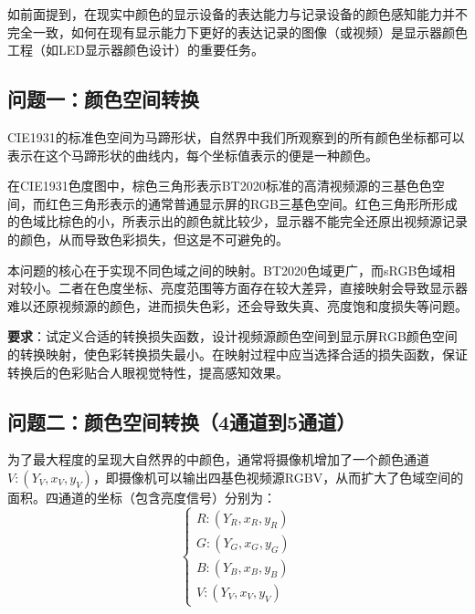 如前面提到，在现实中颜色的显示设备的表达能力与记录设备的颜色感知能力并不完全一致，如何在现有显示能力下更好的表达记录的图像（或视频）是显示器颜色工程（如LED显示器颜色设计）的重要任务。

\subsection[\hspace{-2pt}问题一：颜色空间转换]{{\heiti{} \hspace{-8pt}问题一：颜色空间转换}}\label{subsection1: 问题一}

CIE1931的标准色空间为马蹄形状，自然界中我们所观察到的所有颜色坐标都可以表示在这个马蹄形状的曲线内，每个坐标值表示的便是一种颜色。

在CIE1931色度图中，棕色三角形表示BT2020标准的高清视频源的三基色色空间，而红色三角形表示的通常普通显示屏的RGB三基色空间。红色三角形所形成的色域比棕色的小，所表示出的颜色就比较少，显示器不能完全还原出视频源记录的颜色，从而导致色彩损失，但这是不可避免的。

本问题的核心在于实现不同色域之间的映射。BT2020色域更广，而sRGB色域相对较小。二者在色度坐标、亮度范围等方面存在较大差异，直接映射会导致显示器难以还原视频源的颜色，进而损失色彩，还会导致失真、亮度饱和度损失等问题。

\textbf{要求}：试定义合适的转换损失函数，设计视频源颜色空间到显示屏RGB颜色空间的转换映射，使色彩转换损失最小。在映射过程中应当选择合适的损失函数，保证转换后的色彩贴合人眼视觉特性，提高感知效果。

\subsection[\hspace{-2pt}问题二：颜色空间转换（4通道到5通道）]{{\heiti{} \hspace{-8pt}问题二：颜色空间转换（4通道到5通道）}}\label{subsection1: 问题二}

为了最大程度的呈现大自然界的中颜色，通常将摄像机增加了一个颜色通道$V:(Y_V,x_V,y_V)$，即摄像机可以输出四基色视频源RGBV，从而扩大了色域空间的面积。四通道的坐标（包含亮度信号）分别为：
\begin{equation}
\begin{cases}
R:(Y_R,x_R,y_R) \\
G:(Y_G,x_G,y_G) \\
B:(Y_B,x_B,y_B) \\
V:(Y_V,x_V,y_V)
\end{cases}
\end{equation}

